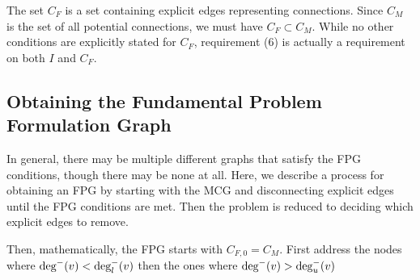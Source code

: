 The set $C_F$ is a set containing explicit edges representing connections. Since $C_M$ is the set of all potential connections, we must have $C_F \subset C_M$. While no other conditions are explicitly stated for $C_F$, requirement (6) is actually a requirement on both $I$ and $C_F$.

\subsection{Obtaining the Fundamental Problem Formulation Graph}
In general, there may be multiple different graphs that satisfy the FPG conditions, though there may be none at all. Here, we describe a process for obtaining an FPG by starting with the MCG and disconnecting explicit edges until the FPG conditions are met. Then the problem is reduced to deciding which explicit edges to remove.

Then, mathematically, the FPG starts with $C_{F,0} = C_M$.
First address the nodes where $\textrm{deg}^-(v) < \textrm{deg}_l^-(v)$ then the ones where $\textrm{deg}^-(v) > \textrm{deg}_u^-(v)$

